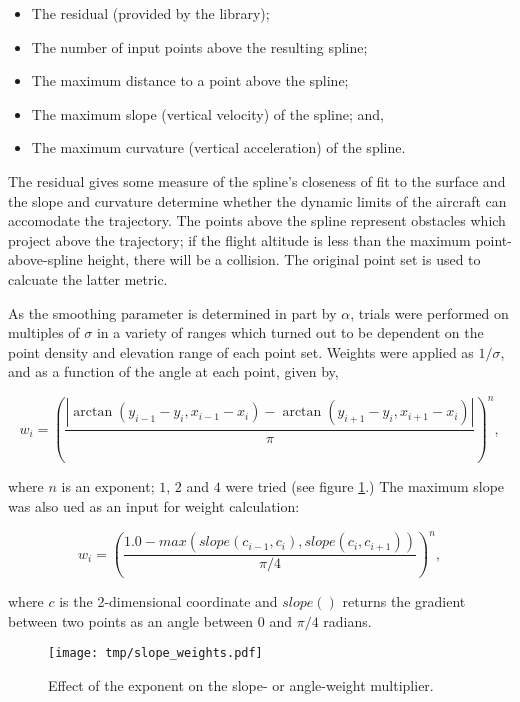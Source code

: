 \documentclass[doc]{apa6}
\begin{document}
\begin{itemize}
\item The residual (provided by the library);
\item The number of input points above the resulting spline;
\item The maximum distance to a point above the spline;
\item The maximum slope (vertical velocity) of the spline; and,
\item The maximum curvature (vertical acceleration) of the spline.
\end{itemize}

The residual gives some measure of the spline's closeness of fit to the surface and the slope and curvature determine whether the dynamic limits of the aircraft can accomodate the trajectory. The points above the spline represent obstacles which project above the trajectory; if the flight altitude is less than the maximum point-above-spline height, there will be a collision. The original point set is used to calcuate the latter metric.

As the smoothing parameter is determined in part by $\alpha$, trials were performed on multiples of $\sigma$ in a variety of ranges which turned out to be dependent on the point density and elevation range of each point set. Weights were applied as $1/\sigma$, and as a function of the angle at each point, given by,

\begin{equation}
w_i = \left( \frac{ 
			|\arctan(y_{i-1}-y_{i}, x_{i-1}-x_{i}) - \arctan(y_{i+1}-y_{i},x_{i+1}-x_{i})|
		}{
			\pi
		}
	\right)^n,
\end{equation}

where $n$ is an exponent; $1$, $2$ and $4$ were tried (see figure \ref{fig:slope_weight}.) The maximum slope was also ued as an input for weight calculation:

\begin{equation}
w_i = \left(
	\frac{
		1.0 - max(slope(c_{i-1}, c_i), slope(c_i, c_{i+1}))
	}
	{\pi/4}
	\right)^n,
\end{equation}

where $c$ is the 2-dimensional coordinate and $slope()$ returns the gradient between two points as an angle between $0$ and $\pi/4$ radians.


\begin{figure} %
\texttt{[image: tmp/slope\_weights.pdf]} 
\caption{Effect of the exponent on the slope- or angle-weight multiplier.}
\label{fig:slope_weight}
\end{figure}
\end{document}
